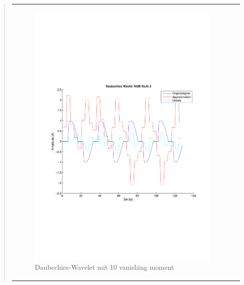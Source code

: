 \begin{quote}
                
        \begin{center}
                \begin{tabular}{ll}
    
                \hspace{-12em}
                    \begin{minipage}{0.6\textwidth}
    
                        \begin{figure}[H]
                            \label{fig:}
                            \includegraphics[scale=0.45, trim = 0.8cm 6cm 3cm
                            7.5cm,
                            clip]{./Bilder/Termin8/Daubechies_Wavlet_10db_lvl_2}
                            \caption{Daubechies-Wavelet mit 10 vanishing moment}
                        \end{figure}
    

\end{minipage}
\end{tabular}
\end{center}
\end{quote}
